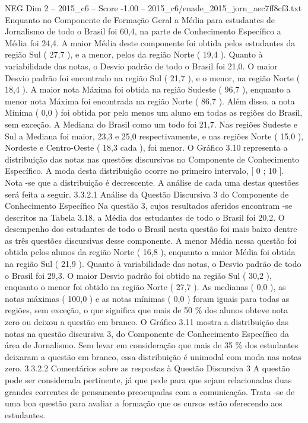 \begin{textsample}{NEG Dim 2 – 2015\_c6 – Score -1.00 – 2015\_c6/enade\_2015\_jorn\_aec7ff8cf3.txt}
Enquanto no Componente de Formação Geral a Média para estudantes de Jornalismo de todo o Brasil foi 60,4, na parte de Conhecimento Específico a Média foi 24,4.
A maior Média deste componente foi obtida pelos estudantes da região Sul ( 27,7 ), e a menor, pelos da região Norte ( 19,4 ).
Quanto à variabilidade das notas, o Desvio padrão de todo o Brasil foi 21,0.
O maior Desvio padrão foi encontrado na região Sul ( 21,7 ), e o menor, na região Norte ( 18,4 ).
A maior nota Máxima foi obtida na região Sudeste ( 96,7 ), enquanto a menor nota Máxima foi encontrada na região Norte ( 86,7 ).
Além disso, a nota Mínima ( 0,0 ) foi obtida por pelo menos um aluno em todas as regiões do Brasil, sem exceção.
A Mediana do Brasil como um todo foi 21,7.
Nas regiões Sudeste e Sul a Mediana foi maior, 23,3 e 25,0 respectivamente, e nas regiões Norte ( 15,0 ), Nordeste e Centro-Oeste ( 18,3 cada ), foi menor.
O Gráfico 3.10 representa a distribuição das notas nas questões discursivas no Componente de Conhecimento Específico.
A moda desta distribuição ocorre no primeiro intervalo, [ 0 ; 10 ].
Nota -se que a distribuição é decrescente.
A análise de cada uma destas questões será feita a seguir. 3.3.2.1 Análise da Questão Discursiva 3 do Componente de Conhecimento Específico Na questão 3, cujos resultados aferidos encontram -se descritos na Tabela 3.18, a Média dos estudantes de todo o Brasil foi 20,2.
O desempenho dos estudantes de todo o Brasil nesta questão foi mais baixo dentre as três questões discursivas desse componente.
A menor Média nessa questão foi obtida pelos alunos da região Norte ( 16,8 ), enquanto a maior Média foi obtida na região Sul ( 21,9 ).
Quanto à variabilidade das notas, o Desvio padrão de todo o Brasil foi 29,3.
O maior Desvio padrão foi obtido na região Sul ( 30,2 ), enquanto o menor foi obtido na região Norte ( 27,7 ).
As medianas ( 0,0 ), as notas máximas ( 100,0 ) e as notas mínimas ( 0,0 ) foram iguais para todas as regiões, sem exceção, o que significa que mais de 50 \% dos alunos obteve nota zero ou deixou a questão em branco.
O Gráfico 3.11 mostra a distribuição das notas na questão discursiva 3, do Componente de Conhecimento Específico da área de Jornalismo.
Sem levar em consideração que mais de 35 \% dos estudantes deixaram a questão em branco, essa distribuição é unimodal com moda nas notas zero. 3.3.2.2 Comentários sobre as respostas à Questão Discursiva 3 A questão pode ser considerada pertinente, já que pede para que sejam relacionadas duas grandes correntes de pensamento preocupadas com a comunicação.
Trata -se de uma boa questão para avaliar a formação que os cursos estão oferecendo aos estudantes.

\end{textsample}
